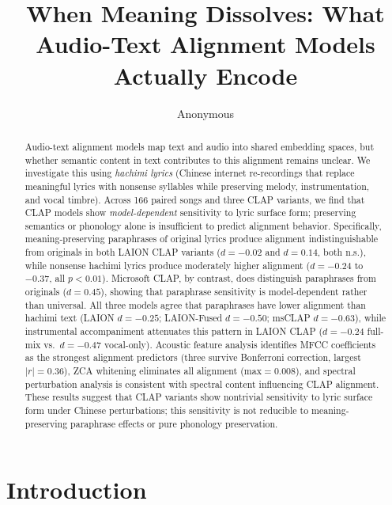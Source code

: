 \documentclass[11pt]{article}
\title{When Meaning Dissolves: What Audio-Text Alignment Models Actually Encode}
\author{Anonymous}
\begin{document}
\maketitle

\begin{abstract}
Audio-text alignment models map text and audio into shared embedding spaces, but whether semantic content in text contributes to this alignment remains unclear. We investigate this using \emph{hachimi lyrics} (Chinese internet re-recordings that replace meaningful lyrics with nonsense syllables while preserving melody, instrumentation, and vocal timbre). Across 166 paired songs and three CLAP variants, we find that CLAP models show \emph{model-dependent} sensitivity to lyric surface form; preserving semantics or phonology alone is insufficient to predict alignment behavior. Specifically, meaning-preserving paraphrases of original lyrics produce alignment indistinguishable from originals in both LAION CLAP variants ($d{=}{-}0.02$ and $d{=}0.14$, both n.s.), while nonsense hachimi lyrics produce moderately higher alignment ($d{=}{-}0.24$ to $-0.37$, all $p{<}0.01$). Microsoft CLAP, by contrast, does distinguish paraphrases from originals ($d{=}0.45$), showing that paraphrase sensitivity is model-dependent rather than universal. All three models agree that paraphrases have lower alignment than hachimi text (LAION $d{=}{-}0.25$; LAION-Fused $d{=}{-}0.50$; msCLAP $d{=}{-}0.63$), while instrumental accompaniment attenuates this pattern in LAION CLAP ($d{=}{-}0.24$ full-mix vs.\ $d{=}{-}0.47$ vocal-only). Acoustic feature analysis identifies MFCC coefficients as the strongest alignment predictors (three survive Bonferroni correction, largest $|r|{=}0.36$), ZCA whitening eliminates all alignment (max${=}0.008$), and spectral perturbation analysis is consistent with spectral content influencing CLAP alignment. These results suggest that CLAP variants show nontrivial sensitivity to lyric surface form under Chinese perturbations; this sensitivity is not reducible to meaning-preserving paraphrase effects or pure phonology preservation.
\end{abstract}

\section{Introduction}\label{sec:intro}
\end{document}
